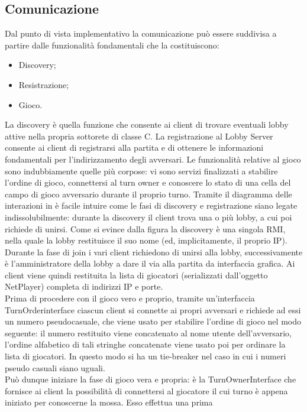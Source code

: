 \subsection{Comunicazione}
Dal punto di vista implementativo la comunicazione può essere suddivisa a 
partire dalle funzionalità fondamentali che la costituiscono:
\begin{itemize}
 \item Discovery;
 \item Resistrazione;
 \item Gioco.
\end{itemize}
La discovery è quella funzione che consente ai client di trovare eventuali 
lobby attive nella propria sottorete di classe C. La registrazione al Lobby 
Server consente ai client di registrarsi alla partita e di ottenere le 
informazioni fondamentali per l'indirizzamento degli avversari. Le funzionalità 
relative al gioco sono indubbiamente quelle più corpose: vi sono servizi 
finalizzati a stabilire l'ordine di gioco, connettersi al turn owner e 
conoscere lo stato di una cella del campo di gioco avversario durante il 
proprio turno.
Tramite il diagramma delle interazioni in %
è facile intuire come le fasi di discovery e registrazione siano legate 
indissolubilmente: durante la discovery il client trova una o più lobby, a cui 
poi richiede di unirsi. Come si evince dalla figura la discovery è una singola 
RMI, nella quale la lobby restituisce il suo nome (ed, implicitamente, il 
proprio IP). Durante la fase di join i vari client richiedono di unirsi alla 
lobby, successivamente è l'amministratore della lobby a dare il via alla 
partita da interfaccia grafica. Ai client viene quindi restituita la lista di 
giocatori (serializzati dall'oggetto NetPlayer) completa di indirizzi IP e 
porte.
\\
Prima di procedere con il gioco vero e proprio, tramite un'interfaccia 
TurnOrderinterface ciascun client si connette ai propri avversari e richiede ad 
essi un numero pseudocasuale, che viene usato per stabilire l'ordine di gioco 
nel modo seguente: il numero restituito viene concatenato al nome utente 
dell'avversario, l'ordine alfabetico di tali stringhe concatenate viene usato 
poi per ordinare la lista di giocatori. In questo modo si ha un tie-breaker nel 
caso in cui i numeri pseudo casuali siano uguali.
\\
Può dunque iniziare la fase di gioco vera e propria: è la TurnOwnerInterface 
che fornisce ai client la possibilità di connettersi al giocatore il cui turno 
è appena iniziato per conoscerne la mossa. Esso effettua una prima 
